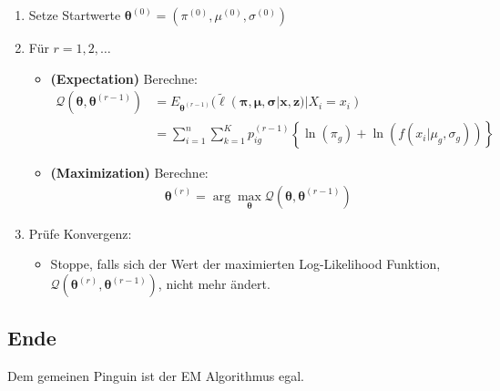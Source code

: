 \documentclass[
  ngerman,
]{book}
\providecommand{\tightlist}{%
  \setlength{\itemsep}{0pt}\setlength{\parskip}{0pt}}
\begin{document}
\begin{enumerate}
\def\labelenumi{\arabic{enumi}.}
\item
  Setze Startwerte \(\boldsymbol{\theta}^{(0)}=(\pi^{(0)}, \mu^{(0)}, \sigma^{(0)})\)
\item
  Für \(r=1,2,\dots\)

  \begin{itemize}
  \item
    {\textbf{(Expectation)} } Berechne:
    \begin{align*}
     \mathcal{Q}(\boldsymbol{\theta},\boldsymbol{\theta}^{(r-1)})
     &=E_{\boldsymbol{\theta}^{(r-1)}}(\tilde{\ell}(\boldsymbol{\pi},\boldsymbol{\mu},\boldsymbol{\sigma}|\mathbf{x},\mathbf{z})|X_i=x_i)\\
     &=\sum_{i=1}^n\sum_{k=1}^Kp_{ig}^{(r-1)}\left\{\ln\left(\pi_g\right)+\ln\left(f(x_i|\mu_g,\sigma_g)\right)\right\}
     \end{align*}
  \item
    {\textbf{(Maximization)}} Berechne:
    \begin{align*}
     \boldsymbol{\theta}^{(r)}=\arg\max_{\boldsymbol{\theta}}\mathcal{Q}(\boldsymbol{\theta},\boldsymbol{\theta}^{(r-1)})
     \end{align*}
  \end{itemize}
\item
  Prüfe Konvergenz:

  \begin{itemize}
  \tightlist
  \item
    Stoppe, falls sich der Wert der maximierten Log-Likelihood Funktion, \(\mathcal{Q}(\boldsymbol{\theta}^{(r)},\boldsymbol{\theta}^{(r-1)})\), nicht mehr ändert.
  \end{itemize}
\end{enumerate}

\hypertarget{ende}{%
\subsection*{Ende}\label{ende}}

Dem gemeinen Pinguin ist der EM Algorithmus egal.

  
\end{document}
